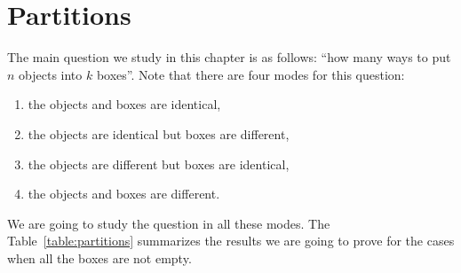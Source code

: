 \chapter{Partitions}
The main question we study in this chapter is as follows:
``how many ways to put $n$ objects into $k$ boxes''.
Note that there are four modes for this question:
\begin{enumerate}
  \item the objects and boxes are identical,
  \item the objects are identical but boxes are different,
  \item the objects are different but boxes are identical,
  \item the objects and boxes are different.
\end{enumerate}
We are going to study the question in all these modes.
The Table~\ref{table:partitions} summarizes the results we are going
to prove for the cases when all the boxes are not empty.
